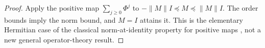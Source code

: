 \begin{proof}
Apply the positive map $\sum_{j\ge0}\Phi^j$ to
$-\|M\|I\preceq M\preceq\|M\|I$. The order bounds imply the norm
bound, and $M=I$ attains it. This is the elementary Hermitian case of
the classical norm-at-identity property for positive maps
\citep{bourin2019}, not a new general operator-theory result.
\end{proof}
